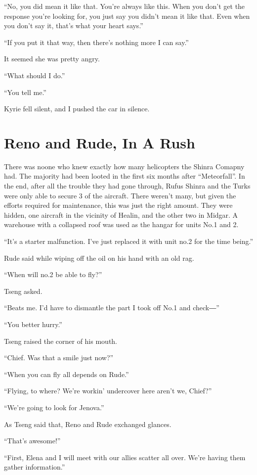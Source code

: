 \documentclass[oneside]{book}
\begin{document}
“No, you did mean it like that. You’re always like this. When you don’t get the response you’re looking for, you just say you didn’t mean it like that. Even when you don’t say it, that’s what your heart says.”

“If you put it that way, then there’s nothing more I can say.”

It seemed she was pretty angry.

“What should I do.”

“You tell me.”

Kyrie fell silent, and I pushed the car in silence.

\chapter{Reno and Rude, In A Rush}
There was noone who knew exactly how many helicopters the Shinra Comapny had. The majority had been looted in the first six months after “Meteorfall”. In the end, after all the trouble they had gone through, Rufus Shinra and the Turks were only able to secure 3 of the aircraft. There weren’t many, but given the efforts required for maintenance, this was just the right amount. They were hidden, one aircraft in the vicinity of Healin, and the other two in Midgar. A warehouse with a collapsed roof was used as the hangar for units No.1 and 2.

“It’s a starter malfunction. I’ve just replaced it with unit no.2 for the time being.”

Rude said while wiping off the oil on his hand with an old rag.

“When will no.2 be able to fly?”

Tseng asked.

“Beats me. I’d have to dismantle the part I took off No.1 and check―”

“You better hurry.”

Tseng raised the corner of his mouth.

“Chief. Was that a smile just now?”

“When you can fly all depends on Rude.”

“Flying, to where? We’re workin’ undercover here aren’t we, Chief?”

“We’re going to look for Jenova.”

As Tseng said that, Reno and Rude exchanged glances.

“That’s awesome!”

“First, Elena and I will meet with our allies scatter all over. We’re having them gather information.”
\end{document}
